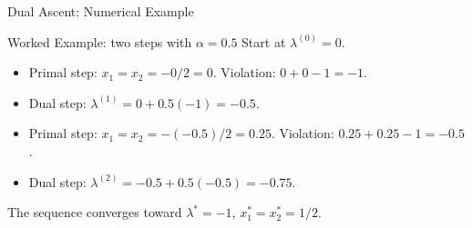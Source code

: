 \documentclass[aspectratio=169,10pt]{beamer}
\begin{document}
\begin{frame}[allowframebreaks]{Dual Ascent: Numerical Example}
  \begin{exampleblock}{Worked Example: two steps with $\alpha = 0.5$}
    Start at $\lambda^{(0)} = 0$.
    \begin{itemize}
      \item Primal step: $x_1 = x_2 = -0/2 = 0$.
            Violation: $0 + 0 - 1 = -1$.
      \item Dual step: $\lambda^{(1)} = 0 + 0.5(-1) = -0.5$.
      \item Primal step: $x_1 = x_2 = -(-0.5)/2 = 0.25$.
            Violation: $0.25 + 0.25 - 1 = -0.5$.
      \item Dual step: $\lambda^{(2)} = -0.5 + 0.5(-0.5) = -0.75$.
    \end{itemize}
    The sequence converges toward $\lambda^* = -1$,
    $x_1^* = x_2^* = 1/2$.
  \end{exampleblock}

\end{frame}
\end{document}
